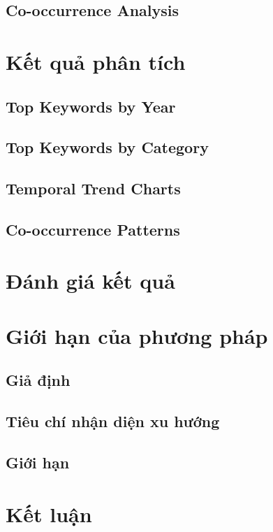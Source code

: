 \documentclass{article}
\begin{document}
\subsection{Co-occurrence Analysis}
\section{Kết quả phân tích}
\subsection{Top Keywords by Year}
\subsection{Top Keywords by Category}
\subsection{Temporal Trend Charts}
\subsection{Co-occurrence Patterns}
\section{Đánh giá kết quả}
\section{Giới hạn của phương pháp}
\subsection{Giả định}
\subsection{Tiêu chí nhận diện xu hướng}
\subsection{Giới hạn}
\section{Kết luận}
\end{document}
